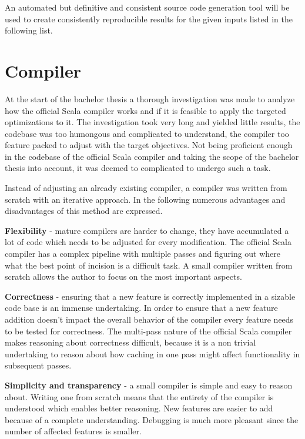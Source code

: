 \documentclass{VUMIFPSbakalaurinis}
\begin{document}
An automated but definitive and consistent source code generation tool will be used to create consistently reproducible results for the given inputs listed in the following list.

\section{Compiler}
At the start of the bachelor thesis a thorough investigation was made to analyze how the official Scala compiler works \cite{ScalaGithub} and if it is feasible to apply the targeted optimizations to it.
The investigation took very long and yielded little results, the codebase was too humongous and complicated to understand, the compiler too feature packed to adjust with the target objectives.
Not being proficient enough in the codebase of the official Scala compiler and taking the scope of the bachelor thesis into account, it was deemed to complicated to undergo such a task.

Instead of adjusting an already existing compiler, a compiler was written from scratch with an iterative approach.
In the following numerous advantages and disadvantages of this method are expressed.

\textbf{Flexibility} - mature compilers are harder to change, they have accumulated a lot of code which needs to be adjusted for every modification.
The official Scala compiler has a complex pipeline with multiple passes and figuring out where what the best point of incision is a difficult task.
A small compiler written from scratch allows the author to focus on the most important aspects.

\textbf{Correctness} - ensuring that a new feature is correctly implemented in a sizable code base is an immense undertaking.
In order to ensure that a new feature addition doesn't impact the overall behavior of the compiler every feature needs to be tested for correctness.
The multi-pass nature of the official Scala compiler makes reasoning about correctness difficult, because it is a non trivial undertaking to reason about how caching in one pass might affect functionality in subsequent passes.

\textbf{Simplicity and transparency} - a small compiler is simple and easy to reason about.
Writing one from scratch means that the entirety of the compiler is understood which enables better reasoning.
New features are easier to add because of a complete understanding.
Debugging is much more pleasant since the number of affected features is smaller.
\end{document}
